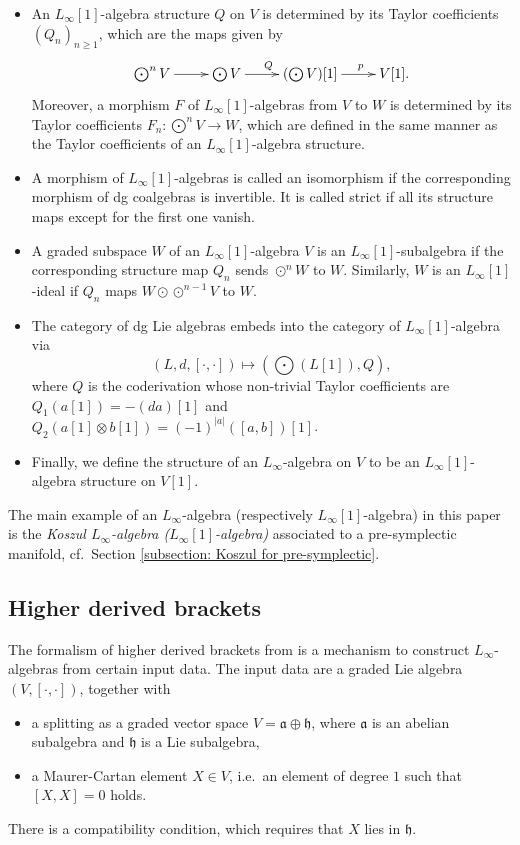 \documentclass[11pt,thmsa]{amsart}
\theoremstyle{definition}
\begin{document}
\begin{itemize}
	\item An $L_\infty[1]$-algebra structure $Q$ on $V$ is determined by its Taylor coefficients $(Q_n)_{n\ge 1}$, which are the maps given by
	$$ 
	\xymatrix{
		\bigodot^n V \ar[r] & \bigodot V \ar[r]^Q & (\bigodot V)[1] \ar[r]^(0.6){p}& V[1].
	}$$
	Moreover, a morphism $F$ of $L_\infty[1]$-algebras from $V$ to $W$
	is determined by its Taylor coefficients
	$F_n: \bigodot^n V \to W$, which are defined in the same manner as
	the Taylor coefficients of an $L_\infty[1]$-algebra structure.
	\item A morphism of $L_\infty[1]$-algebras is called an isomorphism if the corresponding morphism of dg coalgebras is invertible.	It is called strict if all its structure maps except for the first one vanish.
	\item A graded subspace $W$ of an $L_\infty[1]$-algebra $V$ is an $L_\infty[1]$-subalgebra if the corresponding structure map $Q_n$ sends $\odot^n W$ to $W$.
	Similarly, $W$ is an $L_\infty[1]$-ideal if $Q_n$ maps
	$W\odot \odot^{n-1}V$ to $W$.
	\item The category of dg Lie algebras embeds into the category of $L_\infty[1]$-algebra via
	$$ (L,d,[\cdot,\cdot]) \mapsto (\bigodot(L[1]),Q),$$
	where $Q$ is the coderivation whose non-trivial Taylor coefficients are
	$Q_1( a[1]) = - (da)[1]$ and $Q_2( a[1]\otimes  b[1])=(-1)^{|a|}([a, b])[1]$.
	\item Finally, we define the structure of an $L_\infty$-algebra  on $V$ to be an $L_\infty[1]$-algebra structure on $V[1]$.
\end{itemize}



The main example of an $L_\infty$-algebra (respectively $L_\infty[1]$-algebra) in this paper is the {\em Koszul $L_\infty$-algebra ($L_\infty[1]$-algebra)} associated to a pre-symplectic manifold, cf.~Section \ref{subsection: Koszul for pre-symplectic}.



\subsection{Higher derived brackets}

The formalism of higher derived brackets from \cite{Voronov1,Voronov2} is a mechanism to construct $L_\infty$-algebras from certain input data.
The input data are a graded Lie algebra $(V,[\cdot,\cdot])$,
together with
\begin{itemize}
\item a splitting as a graded vector space $V=\mathfrak{a}\oplus \mathfrak{h}$, where $\mathfrak{a}$ is an abelian subalgebra and $\mathfrak{h}$ is a Lie subalgebra,
\item a Maurer-Cartan element $X \in V$, i.e.~an element of degree $1$ such that $[X,X]=0$ holds.
\end{itemize}
There is a compatibility condition, which requires that 
$X$ lies in $\mathfrak{h}$.
\end{document}
